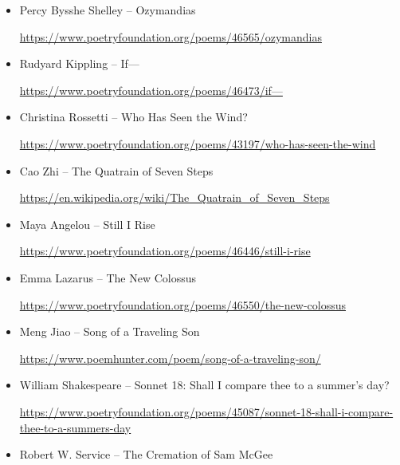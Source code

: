 \documentclass[12pt, openany, letterpaper]{memoir}
\begin{document}
\begin{itemize}
	\item Percy Bysshe Shelley -- Ozymandias
	
	\hyperref[https://www.poetryfoundation.org/poems/46565/ozymandias]{https://www.poetryfoundation.org/poems/46565/ozymandias}
	
	\item Rudyard Kippling -- If---
	
	\hyperref[https://www.poetryfoundation.org/poems/46473/if---]{https://www.poetryfoundation.org/poems/46473/if---}
	
	\item Christina Rossetti -- Who Has Seen the Wind?
	
	\hyperref[https://www.poetryfoundation.org/poems/43197/who-has-seen-the-wind]{https://www.poetryfoundation.org/poems/43197/who-has-seen-the-wind}
	
	\item Cao Zhi -- The Quatrain of Seven Steps
	
	\hyperref[https://en.wikipedia.org/wiki/The_Quatrain_of_Seven_Steps]{https://en.wikipedia.org/wiki/The\_Quatrain\_of\_Seven\_Steps}
		
	\item Maya Angelou -- Still I Rise
	
	\hyperref[https://www.poetryfoundation.org/poems/46446/still-i-rise]{https://www.poetryfoundation.org/poems/46446/still-i-rise}
	
	\item Emma Lazarus -- The New Colossus
	
	\hyperref[https://www.poetryfoundation.org/poems/46550/the-new-colossus]{https://www.poetryfoundation.org/poems/46550/the-new-colossus}
	
	\item Meng Jiao -- Song of a Traveling Son
	
	\hyperref[https://www.poemhunter.com/poem/song-of-a-traveling-son/]{https://www.poemhunter.com/poem/song-of-a-traveling-son/}
	
	\item William Shakespeare -- Sonnet 18: Shall I compare thee to a summer’s day?
	
	\hyperref[https://www.poetryfoundation.org/poems/45087/sonnet-18-shall-i-compare-thee-to-a-summers-day]{https://www.poetryfoundation.org/poems/45087/sonnet-18-shall-i-compare-thee-to-a-summers-day}
	
	\item Robert W. Service -- The Cremation of Sam McGee
	

\end{itemize}
\end{document}
